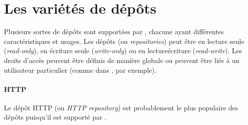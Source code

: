 \documentclass[a4paper,10pt,twoside]{book}
\begin{document}






\section{Les variétés de dépôts}%

Plusieurs sortes de dépôts sont supportées par
\MC, chacune ayant différentes caractéristiques et usages. Les dépôts
(ou \emph{repositories}) peut être en lecture seule
(\emph{read-only}), en écriture seule (\emph{write-only}) ou en
lecture\/écriture (\emph{read-write}). Les droits d'accès peuvent être
définis de manière globale ou peuvent être liés à un utilisateur
particulier (comme dans  \sqsrc, par exemple).

\paragraph{HTTP} Le dépôt HTTP (ou \emph{HTTP repository}) est
probablement le plus populaire des dépôts puisqu'il est supporté par 
 \sqsrc. %
\end{document}
